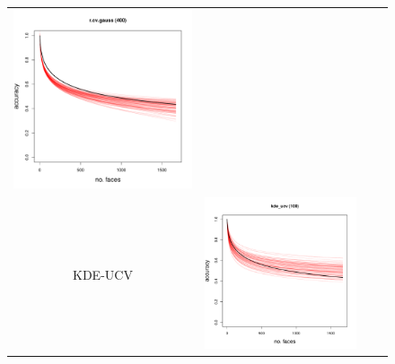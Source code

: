 \documentclass[twoside,11pt]{article}
\newenvironment{myfont}{\fontfamily{phv}\selectfont}{\par}
\begin{document}
\begin{figure}
\begin{tabular}{cccc}
\includegraphics[scale = 0.2, clip = true, trim = 0 0 0 0.6in, valign=c]{repeat_400_r_cv_gauss.pdf} \\
\begin{myfont}KDE-UCV\end{myfont} & 
\includegraphics[scale = 0.2, clip = true, trim = 0 0 0 0.6in, valign=c]{repeat_100_kde_ucv.pdf} &

\end{tabular}
\end{figure}
\end{document}
